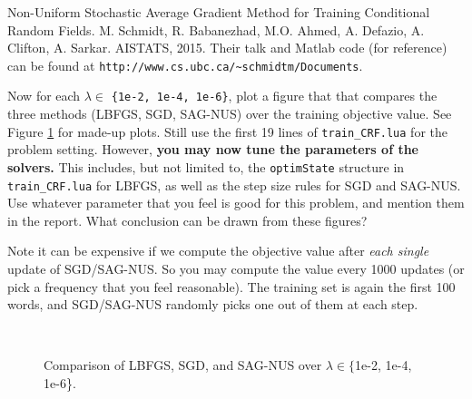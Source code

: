 \documentclass[11pt]{report}
\begin{document}
Non-Uniform Stochastic Average Gradient Method for Training Conditional Random Fields.
M. Schmidt, R. Babanezhad, M.O. Ahmed, A. Defazio, A. Clifton, A. Sarkar. AISTATS, 2015.
%
Their talk and Matlab code (for reference) can be found at
\verb!http://www.cs.ubc.ca/~schmidtm/Documents!.


Now for each $\lambda \in$ \verb!{1e-2, 1e-4, 1e-6}!,
plot a figure that that compares the three methods (LBFGS, SGD, SAG-NUS) over the training objective value.
See Figure \ref{fig:compare_sgd} for made-up plots.
Still use the first 19 lines of \verb!train_CRF.lua! for the problem setting.
However, {\bf you may now tune the parameters of the solvers.}
This includes, but not limited to, the \verb!optimState! structure in \verb!train_CRF.lua! for LBFGS,
as well as the step size rules for SGD and SAG-NUS.
Use whatever parameter that you feel is good for this problem,
and mention them in the report.
What conclusion can be drawn from these figures?

Note it can be expensive if we compute the objective value after \emph{each single} update of SGD/SAG-NUS.
So you may compute the value every 1000 updates (or pick a frequency that you feel reasonable).
The training set is again the first 100 words,
and SGD/SAG-NUS randomly picks one out of them at each step.

\begin{figure}[t]
\centering
{}
~~
~~
\caption{Comparison of LBFGS, SGD, and SAG-NUS over $\lambda \in \{${\sf 1e-2, 1e-4, 1e-6}\}.}
\label{fig:compare_sgd}
\end{figure}
\end{document}
